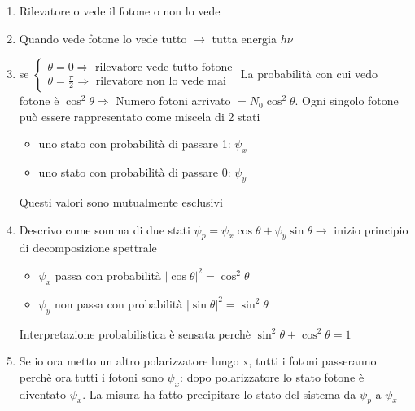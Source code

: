 \begin{enumerate}
    \item Rilevatore o vede il fotone o non lo vede
    \item Quando vede fotone lo vede tutto $\rightarrow $ tutta energia $h\nu$
    \item se $\begin{cases}
        \theta = 0 \Rightarrow \text{ rilevatore vede tutto fotone} \\
        \theta = \frac{\pi}{2} \Rightarrow \text{ rilevatore non lo vede mai}
    \end{cases}$ \newline
    La probabilità con cui vedo fotone è $\cos^2\theta \Rightarrow$ Numero fotoni arrivato $ = N_0\cos^2\theta$. Ogni singolo fotone può essere rappresentato come miscela di 2 stati
    \begin{itemize}
        \item uno stato con probabilità di passare 1: $\psi_x$
        \item uno stato con probabilità di passare 0: $\psi_y$
    \end{itemize}
    Questi valori sono mutualmente esclusivi
    \item Descrivo come somma di due stati $\psi_p = \psi_x \cos\theta + \psi_y \sin\theta \rightarrow$ inizio principio di decomposizione spettrale
    \begin{itemize}
        \item $\psi_x$ passa con probabilità ${|\cos\theta|}^2=\cos^2\theta$
        \item $\psi_y$ non passa con probabilità ${|\sin\theta|}^2=\sin^2\theta$
    \end{itemize}
    Interpretazione probabilistica è sensata perchè $\sin^2\theta + \cos^2\theta = 1$
    \item Se io ora metto un altro polarizzatore lungo x, tutti i fotoni passeranno perchè ora tutti i fotoni sono $\psi_x$: dopo polarizzatore lo stato fotone è diventato $\psi_x$. La misura ha fatto precipitare lo stato del sistema da $\psi_p$ a $\psi_x$
\end{enumerate}

